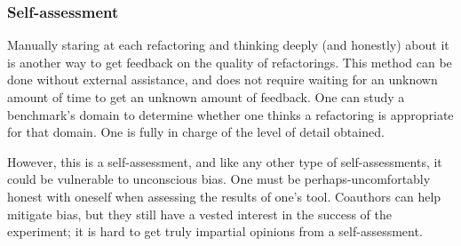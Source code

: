 



\subsubsection{Self-assessment}
Manually staring at each refactoring and thinking deeply (and honestly) about it is another way to get feedback on the quality of refactorings. This method can be done without external assistance, and does not require waiting for an unknown amount of time to get an unknown amount of feedback. One can study a benchmark's domain to determine whether one thinks a refactoring is appropriate for that domain. One is fully in charge of the level of detail obtained.

However, this is a self-assessment, and like any other type of self-assessments, it could be vulnerable to unconscious bias. One must be perhaps-uncomfortably honest with oneself when assessing the results of one's tool. Coauthors can help mitigate bias, but they still have a vested interest in the success of the experiment; it is hard to get truly impartial opinions from a self-assessment.

